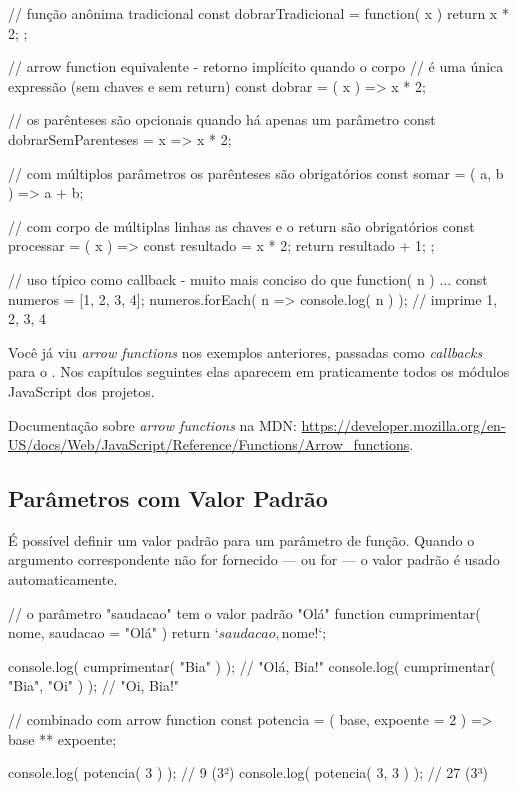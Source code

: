 \begin{boxJavaScriptCode}[title=Arrow functions]
// função anônima tradicional
const dobrarTradicional = function( x ) {
    return x * 2;
};

// arrow function equivalente - retorno implícito quando o corpo
// é uma única expressão (sem chaves e sem return)
const dobrar = ( x ) => x * 2;

// os parênteses são opcionais quando há apenas um parâmetro
const dobrarSemParenteses = x => x * 2;

// com múltiplos parâmetros os parênteses são obrigatórios
const somar = ( a, b ) => a + b;

// com corpo de múltiplas linhas as chaves e o return são obrigatórios
const processar = ( x ) => {
    const resultado = x * 2;
    return resultado + 1;
};

// uso típico como callback - muito mais conciso do que function( n ) {...}
const numeros = [1, 2, 3, 4];
numeros.forEach( n => console.log( n ) ); // imprime 1, 2, 3, 4
\end{boxJavaScriptCode}

Você já viu \textit{arrow functions} nos exemplos anteriores, passadas como \textit{callbacks} para o . Nos capítulos seguintes elas aparecem em praticamente todos os módulos JavaScript dos projetos.

\begin{saibaMais}
    Documentação sobre \textit{arrow functions} na MDN: \url{https://developer.mozilla.org/en-US/docs/Web/JavaScript/Reference/Functions/Arrow_functions}.
\end{saibaMais}


\subsection{Parâmetros com Valor Padrão}

É possível definir um valor padrão para um parâmetro de função. Quando o argumento correspondente não for fornecido --- ou for  --- o valor padrão é usado automaticamente.

\begin{boxJavaScriptCode}[title=Parâmetros com valor padrão]
// o parâmetro "saudacao" tem o valor padrão "Olá"
function cumprimentar( nome, saudacao = "Olá" ) {
    return `${saudacao}, ${nome}!`;
}

console.log( cumprimentar( "Bia" ) );           // "Olá, Bia!"
console.log( cumprimentar( "Bia", "Oi" ) );     // "Oi, Bia!"

// combinado com arrow function
const potencia = ( base, expoente = 2 ) => base ** expoente;

console.log( potencia( 3 ) );    // 9  (3²)
console.log( potencia( 3, 3 ) ); // 27 (3³)
\end{boxJavaScriptCode}

